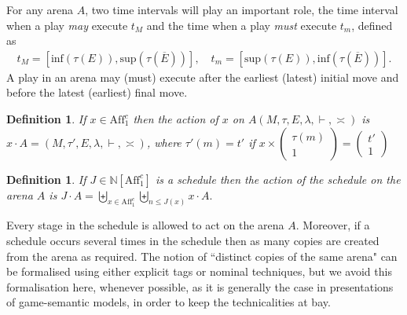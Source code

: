 \documentclass{article}
\newcommand{\aff}{\mathrm{Aff}_1^c}
\newtheorem{definition}[theorem]{Definition}
\begin{document}
For any arena $A$, two time intervals will play an important role, the time interval when a play \emph{may} execute $t_M$ and the time when a play \emph{must} execute $t_m$, defined as
\begin{align*}
t_M = [\text{inf}(\tau (E)), \text{sup}(\tau(\overline E))],\quad
t_m = [\text{sup}(\tau (E)), \text{inf}(\tau(\overline E))].
\end{align*}
A play in an arena may (must) execute after the earliest (latest) initial move and before the latest (earliest) final move. 
\begin{definition}
If $x\in\aff$ then the action of $x$ on $A(M,\tau,E,\lambda,\vdash,{\asymp})$ is 
$
x\cdot A = (M,\tau',E,\lambda,\vdash,{\asymp})
$,
where $\tau'(m)=t'$ if $x\times\left(\begin{smallmatrix} \tau(m) \\ 1 \end{smallmatrix} \right)=\left(\begin{smallmatrix} t'\\ 1 \end{smallmatrix} \right)$
\end{definition}
\begin{definition}\label{def:schedact}
If $J\in\mathbb N[\aff]$ is a schedule then the action of the schedule on the arena $A$ is 
$
J\cdot A = \biguplus_{x\in\aff}\biguplus_{n\leq J(x)}x\cdot A.
$
\end{definition}
Every stage in the schedule is allowed to act on the arena $A$. Moreover, if a schedule occurs several times in the schedule then as many copies are created from the arena as required. The notion of ``distinct copies of the same arena" can be formalised using either explicit tags or nominal techniques, but we avoid this formalisation here, whenever possible, as it is generally the case in presentations of game-semantic models, in order to keep the technicalities at bay. 
\end{document}
